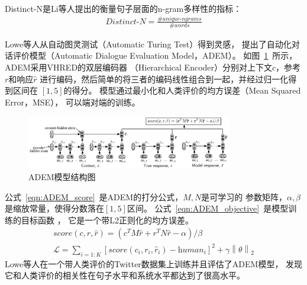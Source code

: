 Distinct-N是Li等人提出的衡量句子层面的n-gram多样性的指标：
\begin{align}
    \textit{Distinct-N} = \frac{\#\textit{unique-ngrams}}{\#\textit{words}}
\end{align}

Lowe等人从自动图灵测试（Automatic Turing Test）得到灵感，
提出了自动化对话评价模型（Automatic Dialogue Evaluation Model，ADEM）。
如图~\ref{fig:ADEM_model}~所示，ADEM采用VHRED的双层编码器
（Hierarchical Encoder）分别对上下文$c$，参考$r$和响应$\hat{r}$
进行编码，然后简单的将三者的编码线性组合到一起，并经过归一化得到区间在
$[1, 5]$的得分。
模型通过最小化和人类评价的均方误差（Mean Squared Error，MSE），
可以端对端的训练。
\begin{figure}[H]
    \centering
    \includegraphics[width=0.8\textwidth]{figure/ADEM.pdf}
    \caption{ADEM模型结构图}
    \label{fig:ADEM_model}
\end{figure}

公式~\ref{eqn:ADEM_score}~是ADEM的打分公式，$M, N$是可学习的
参数矩阵，$\alpha, \beta$是缩放常量，使得分数落在$[1, 5]$区间。
公式~\ref{eqn:ADEM_objective}~是模型训练的目标函数 ，
它是一个带L2正则化的均方误差。
\begin{align}
    \textit{score}(c, r, \hat{r}) = (c^T M \hat{r} + r^T N \hat{r} - \alpha) / \beta
    \label{eqn:ADEM_score} \\
    \mathcal{L} = \sum_{i=1:K} [\textit{score}(c_i, r_i, \hat{r}_i) - \textit{human}_i]^2 + \gamma \left\| \theta \right\| _2
    \label{eqn:ADEM_objective}
\end{align}
Lowe等人在一个带人类评价的Twitter数据集上训练并且评估了ADEM模型，
发现它和人类评价的相关性在句子水平和系统水平都达到了很高水平。


